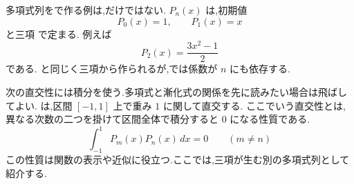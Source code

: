多項式列をで作る例は,だけではない.
 $P_n(x)$ は,初期値
\[
  P_0(x)=1,\qquad P_1(x)=x
\]
と三項
\BookMathLayout{
  \[
    \begin{aligned}
      (n+1)P_{n+1}(x)&=(2n+1)xP_n(x)\\
      &\quad-nP_{n-1}(x)\qquad(n\ge1)
    \end{aligned}
  \]
}{
  \[
    \begin{aligned}
      (n+1)P_{n+1}(x)&=(2n+1)xP_n(x)\\
      &\quad-nP_{n-1}(x)\qquad(n\ge1)
    \end{aligned}
  \]
}
で定まる.
例えば
\[
  P_2(x)=\frac{3x^2-1}{2}
\]
である.
と同じく三項から作られるが,では係数が $n$ にも依存する.

次の直交性には積分を使う.多項式と漸化式の関係を先に読みたい場合は飛ばしてよい.
は,区間 $[-1,1]$ 上で重み $1$ に関して直交する.
ここでいう直交性とは,異なる次数の二つを掛けて区間全体で積分すると $0$ になる性質である.
\[
  \int_{-1}^{1}P_m(x)P_n(x)\,dx=0
  \qquad(m\ne n)
\]
この性質は関数の表示や近似に役立つ.ここでは,三項が生む別の多項式列として紹介する.
